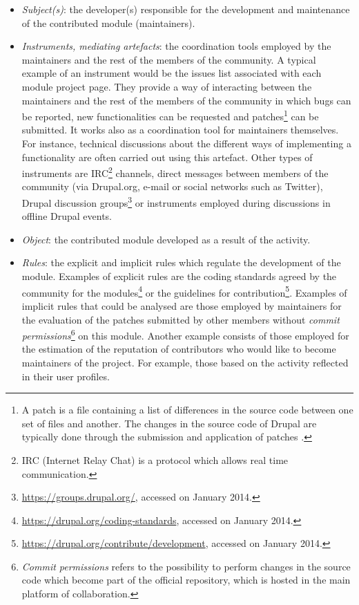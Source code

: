 \documentclass[a4paper, 12pt]{article}
\begin{document}
\begin{itemize}
	\item \textit{Subject(s)}: the developer(s) responsible for the development and maintenance of the contributed module (maintainers).
	\item \textit{Instruments, mediating artefacts}: the coordination tools employed by the maintainers and the rest of the members of the community. A typical example of an instrument would be the issues list associated with each module project page. They provide a way of interacting between the maintainers and the rest of the members of the community in which bugs can be reported, new functionalities can be requested and patches\footnote{A patch is a file containing a list of differences in the source code between one set of files and another. The changes in the source code of Drupal are typically done through the submission and application of patches \parencite{drupal-patches:2015:Online}.} can be submitted. It works also as a coordination tool for maintainers themselves. For instance, technical discussions about the different ways of implementing a functionality are often carried out using this artefact. Other types of instruments are IRC\footnote{IRC (Internet Relay Chat) is a protocol which allows real time communication.} channels, direct messages between members of the community (via Drupal.org, e-mail or social networks such as Twitter), Drupal discussion groups\footnote{\url{https://groups.drupal.org/}, accessed on  January 2014.} or instruments employed during discussions in offline Drupal events.
	\item \textit{Object}: the contributed module developed as a result of the activity.
	\item \textit{Rules}: the explicit and implicit rules which regulate the development of the module. Examples of explicit rules are the coding standards agreed by the community for the modules\footnote{\url{https://drupal.org/coding-standards}, accessed on  January 2014.} or the guidelines for contribution\footnote{\url{https://drupal.org/contribute/development}, accessed on  January 2014.}. Examples of implicit rules that could be analysed are those employed by maintainers for the evaluation of the patches submitted by other members without \textit{commit permissions}\footnote{\textit{Commit permissions} refers to the possibility to perform changes in the source code which become part of the official repository, which is hosted in the main platform of collaboration.} on this module. Another example consists of those employed for the estimation of the reputation of contributors who would like to become maintainers of the project. For example, those based on the activity reflected in their user profiles. 

\end{itemize}
\end{document}
